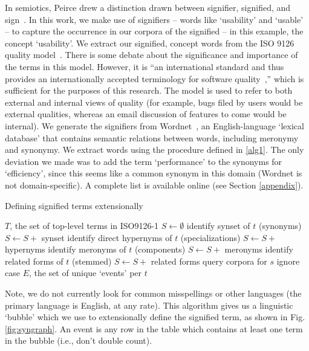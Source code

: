 \documentclass[conference, compsoc]{IEEEtran}
\begin{document}
In semiotics, Peirce drew a distinction drawn between signifier, signified, and sign~\cite{atkin2006}. In this work, we make use of signifiers -- words like `usability' and `usable' -- to capture the occurrence in our corpora of the signified -- in this example, the concept `usability'. We extract our signified, concept words from the ISO 9126 quality model~\cite{iso9126}. There is some debate about the significance and importance of the terms in this model. However, it is ``an international standard and thus provides an internationally accepted terminology for software quality~\cite[p. 58]{Boegh2008},'' which is sufficient for the purposes of this research. The model is used to refer to both external and internal views of quality (for example, bugs filed by users would be external qualities, whereas an email discussion of features to come would be internal). We generate the signifiers from Wordnet~\cite{Fellbaum1998}, an English-language `lexical database' that contains semantic relations between words, including meronymy and synonymy. We extract words using the procedure defined in \ref{alg1}. The only deviation we made was to add the term `performance' to the synonyms for `efficiency', since this seems like a common synonym in this domain (Wordnet is not domain-specific). A complete list is available online (see Section \ref{appendix}). %

\renewcommand{\algorithmiccomment}[1]{// #1}
\begin{algorithm}[H]
\caption{Defining signified terms extensionally}
  \label{alg1}
\begin{algorithmic}
	\REQUIRE $T$, the set of top-level terms in ISO9126-1
	\STATE $S \leftarrow \emptyset $
	\STATE identify synset of $t$ (synonyms)%
	\STATE $S \leftarrow S +$ synset
	\STATE identify direct hypernyms of $t$ (specializations)%
	\STATE $S \leftarrow S +$ hypernyms %
	\STATE identify meronyms of $t$ (components)%
	\STATE $S \leftarrow S +$ meronyms %
	\STATE identify related forms of $t$ (stemmed)%
	\STATE $S \leftarrow S +$ related forms
		\STATE query corpora for $s$
		\COMMENT ignore case
	\ENDFOR
  \ENDFOR
\RETURN $E$, the set of unique `events' per $t$

\end{algorithmic}
\end{algorithm}
Note, we do not currently look for common misspellings or other languages (the primary language is English, at any rate). This algorithm gives us a linguistic `bubble' which we use to extensionally define the signified term, as shown in Fig. \ref{fig:syngraph}. An event is any row in the table which contains at least one term in the bubble (i.e., don't double count). 
\end{document}
